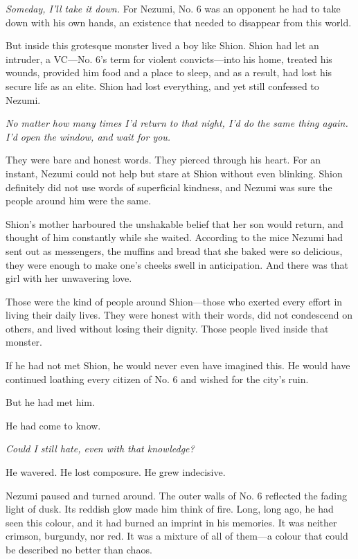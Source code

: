 \emph{Someday, I'll take it down.} For Nezumi, No. 6 was an opponent he had to
take down with his own hands, an existence that needed to disappear from
this world.

But inside this grotesque monster lived a boy like Shion. Shion had let
an intruder, a VC---No. 6's term for violent convicts---into his home,
treated his wounds, provided him food and a place to sleep, and as a
result, had lost his secure life as an elite. Shion had lost everything,
and yet still confessed to Nezumi.

\emph{No matter how many times I'd return to that night, I'd do the same
thing again. I'd open the window, and wait for you.}

They were bare and honest words. They pierced through his heart. For an
instant, Nezumi could not help but stare at Shion without even blinking.
Shion definitely did not use words of superficial kindness, and Nezumi
was sure the people around him were the same.

Shion's mother harboured the unshakable belief that her son would
return, and thought of him constantly while she waited. According to the
mice Nezumi had sent out as messengers, the muffins and bread that she
baked were so delicious, they were enough to make one's cheeks swell in
anticipation. And there was that girl with her unwavering love.

Those were the kind of people around Shion---those who exerted every
effort in living their daily lives. They were honest with their words,
did not condescend on others, and lived without losing their dignity.
Those people lived inside that monster.

If he had not met Shion, he would never even have imagined this. He
would have continued loathing every citizen of No. 6 and wished for the
city's ruin.

But he had met him.

He had come to know.

\emph{Could I still hate, even with that knowledge?}

He wavered. He lost composure. He grew indecisive.

Nezumi paused and turned around. The outer walls of No. 6 reflected the
fading light of dusk. Its reddish glow made him think of fire. Long,
long ago, he had seen this colour, and it had burned an imprint in his
memories. It was neither crimson, burgundy, nor red. It was a mixture of
all of them---a colour that could be described no better than chaos.

